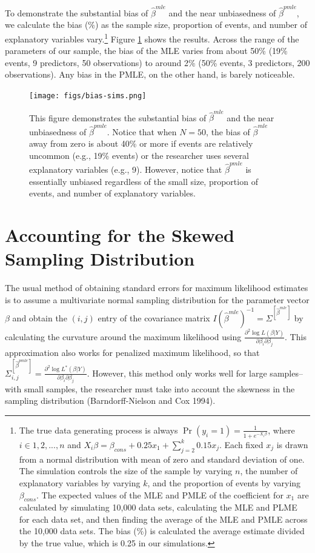 \documentclass[12pt]{article}
\begin{document}
To demonstrate the substantial bias of $\hat{\beta}^{mle}$ and the near unbiasedness of $\hat{\beta}^{pmle}$, we calculate the bias (\%) as the sample size, proportion of events, and number of explanatory variables vary.\footnote{The true data generating process is always $\Pr(y_i = 1) = \frac{1}{1 + e^{-X_i \beta}}$, where $i \in 1, 2,..., n$ and $X_i \beta = \beta_{cons} + 0.25 x_1 + \sum_{j = 2}^k 0.15 x_j$. Each fixed $x_j$ is drawn from a normal distribution with mean of zero and standard deviation of one. The simulation controls the size of the sample by varying $n$, the number of explanatory variables by varying $k$, and the proportion of events by varying $\beta_{cons}$. The expected values of the MLE  and PMLE of the coefficient for $x_1$ are calculated by simulating 10,000 data sets, calculating the MLE and PLME for each data set, and then finding the average of the MLE and PMLE across the 10,000 data sets. The bias (\%) is calculated the average estimate divided by the true value, which is 0.25 in our simulations.} Figure \ref{fig:bias-sims} shows the results. Across the range of the parameters of our sample, the bias of the MLE varies from about 50\% (19\% events, 9 predictors, 50 observations) to around 2\% (50\% events, 3 predictors, 200 observations). Any bias in the PMLE, on the other hand, is barely noticeable.

\begin{figure}[H]
\begin{center}
\texttt{[image: figs/bias-sims.png]}
\caption{This figure demonstrates the substantial bias of $\hat{\beta}^{mle}$ and the near unbiasedness of $\hat{\beta}^{pmle}$. Notice that when $N = 50$, the bias of $\hat{\beta}^{mle}$ away from zero is about 40\% or more if events are relatively uncommon (e.g., 19\% events) or the researcher uses several explanatory variables (e.g., 9). However, notice that $\hat{\beta}^{pmle}$ is essentially unbiased regardless of the small size, proportion of events, and number of explanatory variables.}\label{fig:bias-sims}
\end{center}
\end{figure}

\section*{Accounting for the Skewed Sampling Distribution}

The usual method of obtaining standard errors for maximum likelihood estimates is to assume a multivariate normal sampling distribution for the parameter vector $\beta$ and obtain the $(i, j)$ entry of the covariance matrix $I(\hat{\beta}^{mle})^{-1} = \Sigma^{[\hat{\beta}^{mle}]}$ by calculating the curvature around the maximum likelihood using $\frac{\partial^2 \log L(\beta | Y)}{\partial \beta_i \partial \beta_j}$. This approximation also works for penalized maximum likelihood, so that $\Sigma^{[\hat{\beta}^{pmle}]}_{i,j} = \frac{\partial^2 \log L^*(\beta | Y)}{\partial \beta_i \partial \beta_j}$. However, this method only works well for large samples--with small samples, the researcher must take into account the skewness in the sampling distribution (Barndorff-Nielson and Cox 1994).
\end{document}
